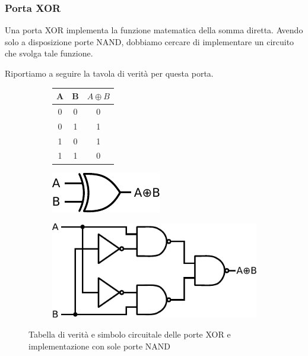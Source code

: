 \subsubsection{Porta XOR}

Una porta XOR implementa la funzione matematica della somma diretta.
Avendo solo a disposizione porte NAND, dobbiamo cercare di implementare un circuito che svolga tale funzione.

Riportiamo a seguire la tavola di verità per questa porta.

\begin{figure}[htpc]
\centering
	\begin{subfigure}[hc]{.4\textwidth}
		\centering
		{\renewcommand{\arraystretch}{1.1}%
		\begin{tabular}{|c|c|c|}
		\hline
		A & B & $A \oplus B$ \\
		\hline
		0 & 0 & 0\\
		\hline
		0 & 1 & 1\\
		\hline
		1 & 0 & 1\\
		\hline
		1 & 1 & 0\\
		\hline
		\end{tabular}}
		\label{tab9:XOR}
        \end{subfigure}
        \begin{subfigure}[hc]{.15\textwidth}
		\centering
		\includegraphics[width=.99\textwidth]{../E09/latex/XOR.pdf}
		\label{cir9:XOR}
	\end{subfigure}
        \begin{subfigure}[hc]{.4\textwidth}
		\centering
		\includegraphics[width=.7\textwidth]{../E09/latex/iXOR.pdf}
		\label{cir9:iXOR}
        \end{subfigure}
\caption{Tabella di verità e simbolo circuitale delle porte XOR e implementazione con sole porte NAND}
\label{cir9:xor}
\end{figure}

